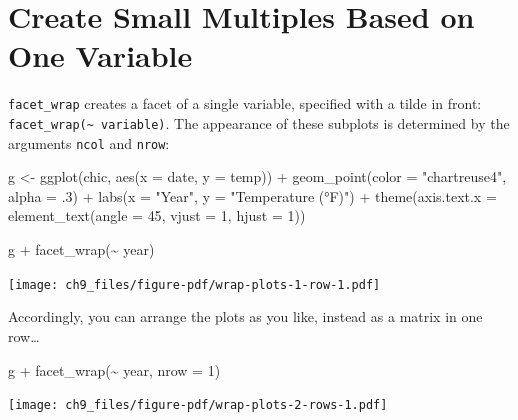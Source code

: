 \documentclass[
  letterpaper,
]{scrbook}
\newenvironment{Shaded}{\begin{snugshade}}{\end{snugshade}}
\newcommand{\AttributeTok}[1]{\textcolor[rgb]{0.40,0.45,0.13}{#1}}
\newcommand{\DecValTok}[1]{\textcolor[rgb]{0.68,0.00,0.00}{#1}}
\newcommand{\FunctionTok}[1]{\textcolor[rgb]{0.28,0.35,0.67}{#1}}
\newcommand{\NormalTok}[1]{\textcolor[rgb]{0.00,0.23,0.31}{#1}}
\newcommand{\OtherTok}[1]{\textcolor[rgb]{0.00,0.23,0.31}{#1}}
\newcommand{\SpecialCharTok}[1]{\textcolor[rgb]{0.37,0.37,0.37}{#1}}
\newcommand{\StringTok}[1]{\textcolor[rgb]{0.13,0.47,0.30}{#1}}
\begin{document}
\section{Create Small Multiples Based on One
Variable}\label{create-small-multiples-based-on-one-variable}

\texttt{facet\_wrap} creates a facet of a single variable, specified
with a tilde in front:
\texttt{facet\_wrap(\textasciitilde{}\ variable)}. The appearance of
these subplots is determined by the arguments \texttt{ncol} and
\texttt{nrow}:

\begin{Shaded}
\begin{Highlighting}[]
\NormalTok{g }\OtherTok{\textless{}{-}}
  \FunctionTok{ggplot}\NormalTok{(chic, }\FunctionTok{aes}\NormalTok{(}\AttributeTok{x =}\NormalTok{ date, }\AttributeTok{y =}\NormalTok{ temp)) }\SpecialCharTok{+}
    \FunctionTok{geom\_point}\NormalTok{(}\AttributeTok{color =} \StringTok{"chartreuse4"}\NormalTok{, }\AttributeTok{alpha =}\NormalTok{ .}\DecValTok{3}\NormalTok{) }\SpecialCharTok{+}
    \FunctionTok{labs}\NormalTok{(}\AttributeTok{x =} \StringTok{"Year"}\NormalTok{, }\AttributeTok{y =} \StringTok{"Temperature (°F)"}\NormalTok{) }\SpecialCharTok{+}
    \FunctionTok{theme}\NormalTok{(}\AttributeTok{axis.text.x =} \FunctionTok{element\_text}\NormalTok{(}\AttributeTok{angle =} \DecValTok{45}\NormalTok{, }\AttributeTok{vjust =} \DecValTok{1}\NormalTok{, }\AttributeTok{hjust =} \DecValTok{1}\NormalTok{))}

\NormalTok{g }\SpecialCharTok{+} \FunctionTok{facet\_wrap}\NormalTok{(}\SpecialCharTok{\textasciitilde{}}\NormalTok{ year)}
\end{Highlighting}
\end{Shaded}

\texttt{[image: ch9\_files/figure-pdf/wrap-plots-1-row-1.pdf]}

Accordingly, you can arrange the plots as you like, instead as a matrix
in one row\ldots{}

\begin{Shaded}
\begin{Highlighting}[]
\NormalTok{g }\SpecialCharTok{+} \FunctionTok{facet\_wrap}\NormalTok{(}\SpecialCharTok{\textasciitilde{}}\NormalTok{ year, }\AttributeTok{nrow =} \DecValTok{1}\NormalTok{)}
\end{Highlighting}
\end{Shaded}

\texttt{[image: ch9\_files/figure-pdf/wrap-plots-2-rows-1.pdf]}
\end{document}
